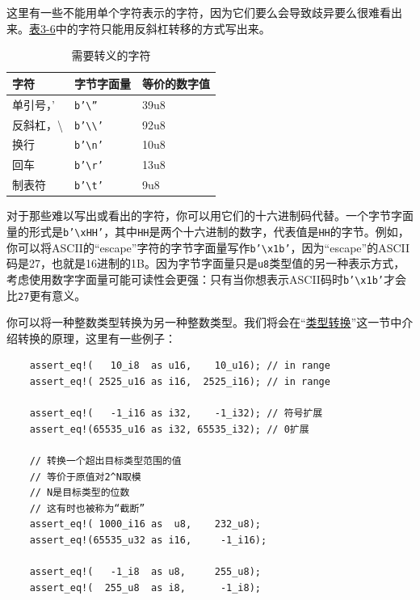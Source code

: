 这里有一些不能用单个字符表示的字符，因为它们要么会导致歧异要么很难看出来。\hyperref[t3-6]{表3-6}中的字符只能用反斜杠转移的方式写出来。
\begin{table}[htbp]
    \centering
    \caption{需要转义的字符}
    \label{t3-6}
    \begin{tabular}{lll}
        \hline
        \textbf{字符}   &   \textbf{字节字面量} & \textbf{等价的数字值} \\
        \hline
        单引号，'   &   \texttt{b'\textbackslash''}      & 39u8 \\
        \rowcolor{tablecolor}
        反斜杠，\textbackslash &    \texttt{b'\textbackslash\textbackslash'} & 92u8 \\
        换行        &    \texttt{b'\textbackslash n'}    & 10u8 \\
        \rowcolor{tablecolor}
        回车        &   \texttt{b'\textbackslash r'}     & 13u8 \\
        制表符      &   \texttt{b'\textbackslash t'}     & 9u8 \\
    \end{tabular}
\end{table}

对于那些难以写出或看出的字符，你可以用它们的十六进制码代替。一个字节字面量的形式是\texttt{b'\textbackslash xHH'}，其中\texttt{HH}是两个十六进制的数字，代表值是\texttt{HH}的字节。例如，你可以将ASCII的“escape”字符的字节字面量写作\texttt{b'\textbackslash x1b'}，因为“escape”的ASCII码是27，也就是16进制的1B。因为字节字面量只是\texttt{u8}类型值的另一种表示方式，考虑使用数字字面量可能可读性会更强：只有当你想表示ASCII码时\texttt{b'\textbackslash x1b'}才会比\texttt{27}更有意义。

你可以将一种整数类型转换为另一种整数类型。我们将会在“\hyperref[cast]{类型转换}”这一节中介绍转换的原理，这里有一些例子：
\begin{verbatim}
    assert_eq!(   10_i8  as u16,    10_u16); // in range
    assert_eq!( 2525_u16 as i16,  2525_i16); // in range

    assert_eq!(   -1_i16 as i32,    -1_i32); // 符号扩展
    assert_eq!(65535_u16 as i32, 65535_i32); // 0扩展

    // 转换一个超出目标类型范围的值
    // 等价于原值对2^N取模
    // N是目标类型的位数
    // 这有时也被称为“截断”
    assert_eq!( 1000_i16 as  u8,    232_u8);
    assert_eq!(65535_u32 as i16,     -1_i16);

    assert_eq!(   -1_i8  as u8,     255_u8);
    assert_eq!(  255_u8  as i8,      -1_i8);
\end{verbatim}

